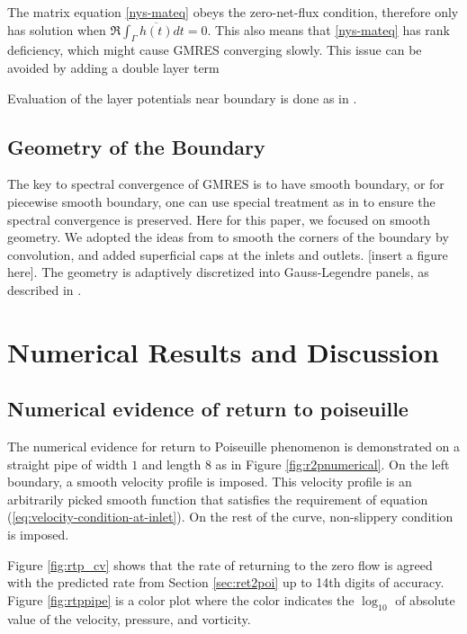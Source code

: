 \documentclass[10pt,twocolumn]{article}
\begin{document}
The matrix equation \eqref{nys-mateq} 
obeys the zero-net-flux condition, 
therefore only has solution when $\Re \int_\Gamma \overline{h(t)} dt = 0$. 
This also means that \eqref{nys-mateq} has rank deficiency, which might cause GMRES converging slowly. 
This issue can be avoided by adding a double layer term 



Evaluation of the layer potentials near boundary is done as in \cite{wuSolutionStokesFlow2020}. 

\subsection{Geometry of the Boundary}

The key to spectral convergence of GMRES is to have smooth boundary, 
or for piecewise smooth boundary, one can use special treatment as in \cite{wuSolutionStokesFlow2020}
to ensure the spectral convergence is preserved. Here for this paper, we focused on smooth geometry. 
We adopted the ideas from 
\cite{epsteinSmoothedCornersScattered2016,baggeHighlyAccurateSpecial2021} 
to smooth the corners of the boundary by convolution, and added superficial caps at the 
inlets and outlets. [insert a figure here]. The geometry is adaptively discretized into Gauss-Legendre panels, as described in
\cite{wuSolutionStokesFlow2020}. 


\section{Numerical Results and Discussion\label{sec:numericalresults}}
\subsection{Numerical evidence of return to poiseuille}


The numerical evidence for return to Poiseuille phenomenon is 
demonstrated on a straight pipe of width $1$ and length $8$ as in Figure \ref{fig:r2pnumerical}. 
On the left boundary, a smooth velocity profile is imposed. 
This velocity profile is an arbitrarily picked smooth function that satisfies 
the requirement of equation (\ref{eq:velocity-condition-at-inlet}). 
On the rest of the curve, non-slippery condition is imposed.

Figure \ref{fig:rtp_cv} shows that the rate of returning 
to the zero flow is agreed with the 
predicted rate from Section \ref{sec:ret2poi} up to 14th digits of accuracy. 
Figure \ref{fig:rtppipe} is a color
plot where the color indicates the $\log_{10}$ of absolute value of the velocity, 
pressure, and vorticity. 
\end{document}
